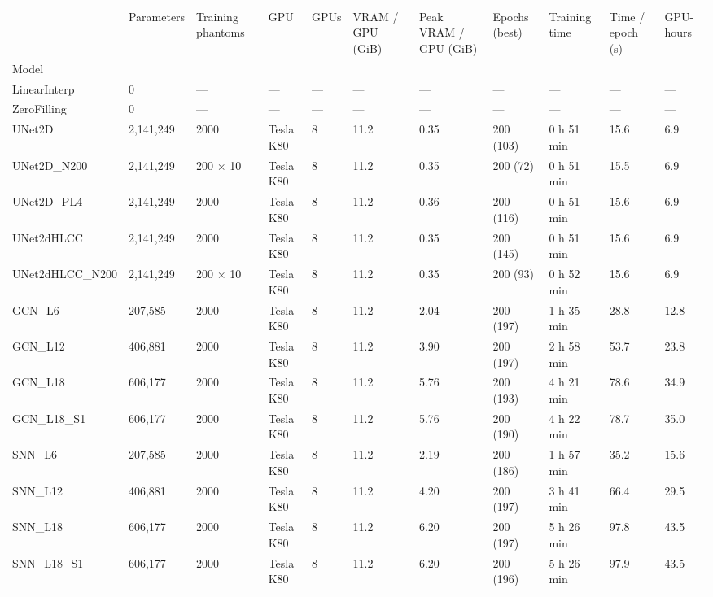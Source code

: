 \begin{tabular}{lllllllllll}
\toprule
 & Parameters & Training phantoms & GPU & GPUs & VRAM / GPU (GiB) & Peak VRAM / GPU (GiB) & Epochs (best) & Training time & Time / epoch (s) & GPU-hours \\
Model &  &  &  &  &  &  &  &  &  &  \\
\midrule
LinearInterp & 0 & — & — & — & — & — & — & — & — & — \\
ZeroFilling & 0 & — & — & — & — & — & — & — & — & — \\
UNet2D & 2,141,249 & 2000 & Tesla K80 & 8 & 11.2 & 0.35 & 200 (103) & 0 h 51 min & 15.6 & 6.9 \\
UNet2D\_N200 & 2,141,249 & 200 $\times$ 10 & Tesla K80 & 8 & 11.2 & 0.35 & 200 (72) & 0 h 51 min & 15.5 & 6.9 \\
UNet2D\_PL4 & 2,141,249 & 2000 & Tesla K80 & 8 & 11.2 & 0.36 & 200 (116) & 0 h 51 min & 15.6 & 6.9 \\
UNet2dHLCC & 2,141,249 & 2000 & Tesla K80 & 8 & 11.2 & 0.35 & 200 (145) & 0 h 51 min & 15.6 & 6.9 \\
UNet2dHLCC\_N200 & 2,141,249 & 200 $\times$ 10 & Tesla K80 & 8 & 11.2 & 0.35 & 200 (93) & 0 h 52 min & 15.6 & 6.9 \\
GCN\_L6 & 207,585 & 2000 & Tesla K80 & 8 & 11.2 & 2.04 & 200 (197) & 1 h 35 min & 28.8 & 12.8 \\
GCN\_L12 & 406,881 & 2000 & Tesla K80 & 8 & 11.2 & 3.90 & 200 (197) & 2 h 58 min & 53.7 & 23.8 \\
GCN\_L18 & 606,177 & 2000 & Tesla K80 & 8 & 11.2 & 5.76 & 200 (193) & 4 h 21 min & 78.6 & 34.9 \\
GCN\_L18\_S1 & 606,177 & 2000 & Tesla K80 & 8 & 11.2 & 5.76 & 200 (190) & 4 h 22 min & 78.7 & 35.0 \\
SNN\_L6 & 207,585 & 2000 & Tesla K80 & 8 & 11.2 & 2.19 & 200 (186) & 1 h 57 min & 35.2 & 15.6 \\
SNN\_L12 & 406,881 & 2000 & Tesla K80 & 8 & 11.2 & 4.20 & 200 (197) & 3 h 41 min & 66.4 & 29.5 \\
SNN\_L18 & 606,177 & 2000 & Tesla K80 & 8 & 11.2 & 6.20 & 200 (197) & 5 h 26 min & 97.8 & 43.5 \\
SNN\_L18\_S1 & 606,177 & 2000 & Tesla K80 & 8 & 11.2 & 6.20 & 200 (196) & 5 h 26 min & 97.9 & 43.5 \\
\bottomrule
\end{tabular}
